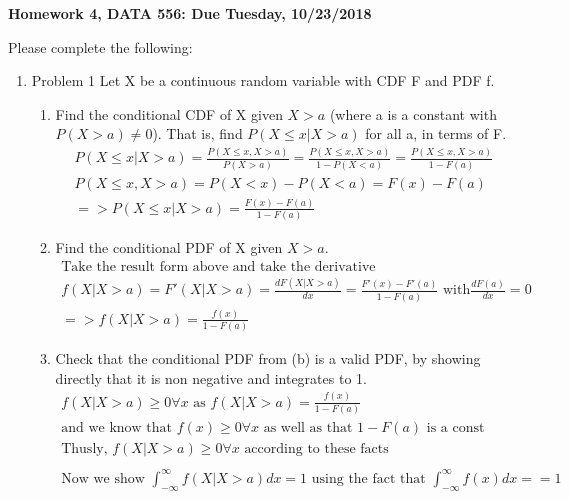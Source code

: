 \documentclass[11pt]{article}
\begin{document}
\begin{title}
	{\Large\bf Homework 4, DATA 556: Due Tuesday, 10/23/2018}
\end{title}

\author{\bf Alexander Van Roijen}

\maketitle

\newpage
Please complete the following:
\begin{enumerate}
\item Problem 1
Let X be a continuous random variable with CDF F and PDF f.
\begin{enumerate}
	\item Find the conditional CDF of X given $X > a$ (where a is a constant with $P(X>a) \ne 0$). That is, find $P(X\le x|X>a)$ for all a, in terms of F.
	\begin{gather}
	P(X \le x | X > a) = \frac{P(X \le x , X > a)}{P(X>a)} = \frac{P(X \le x , X > a)}{1-P(X<a)} = \frac{P(X \le x , X > a)}{1-F(a)} \\
	P(X \le x , X > a) = P(X<x) - P(X<a) = F(x) - F(a)\\
	=>P(X \le x | X > a) = \frac{F(x)-F(a)}{1-F(a)}
	\end{gather}
	\item Find the conditional PDF of X given $X > a$.
	\begin{gather}
	\text{Take the result form above and take the derivative }\\
	f(X|X>a) = F'(X|X>a) = \frac{dF(X|X>a)}{dx} = \frac{F'(x)-F'(a)}{1-F(a)} \text{ with} \frac{dF(a)}{dx} = 0 \\
	=> f(X|X>a) =\frac{f(x)}{1-F(a)}
	\end{gather}
	\item Check that the conditional PDF from (b) is a valid PDF, by showing directly that it is non negative and integrates to 1.
	\begin{gather}
	f(X|X>a) \ge 0 \forall x \text{ as } f(X|X>a) =\frac{f(x)}{1-F(a)} \\
	\text{and we know that } f(x) \ge 0 \forall x \text{ as well as that } 1-F(a) \text{ is a const}
	\\
	\text{Thusly, } f(X|X>a) \ge 0 \forall x \text{ according to these facts}
	\\
	\\
	\text{Now we show } \int_{-\infty}^{\infty} f(X|X>a)dx = 1 \text{ using the fact that } \int_{-\infty}^{\infty} f(x)dx =  = 1 \\

\end{gather}
\end{enumerate}
\end{enumerate}
\end{document}

